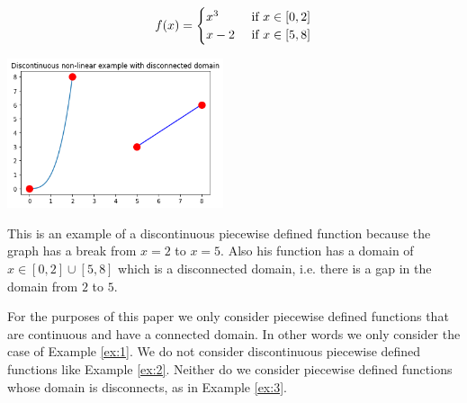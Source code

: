 \documentclass[10pt]{article}
\begin{document}
\begin{example}
\label{ex:3}
$$
f(x) =
\begin{cases}
x^3 & \hbox{ if } x\in [0,2] \\
x-2 & \hbox{ if } x \in [5, 8]
\end{cases}
$$
\begin{center}
\includegraphics[width=2.5in]{graph3}
\end{center}
This is an example of a discontinuous piecewise defined function because the
graph has a break from $x=2$ to $x=5$.  Also his function has a domain of
$x \in [0, 2] \cup [5,8]$ which is a disconnected domain, i.e.
there is a gap in the domain from $2$ to $5$.
\end{example}

For the purposes of this paper we only consider piecewise defined functions
that are continuous and have a connected domain.  In other words we only
consider the case of Example \ref{ex:1}.  We do not consider discontinuous
piecewise defined functions like Example \ref{ex:2}.  Neither do we consider
piecewise defined functions whose domain is disconnects, as in Example
\ref{ex:3}.
\end{document}
